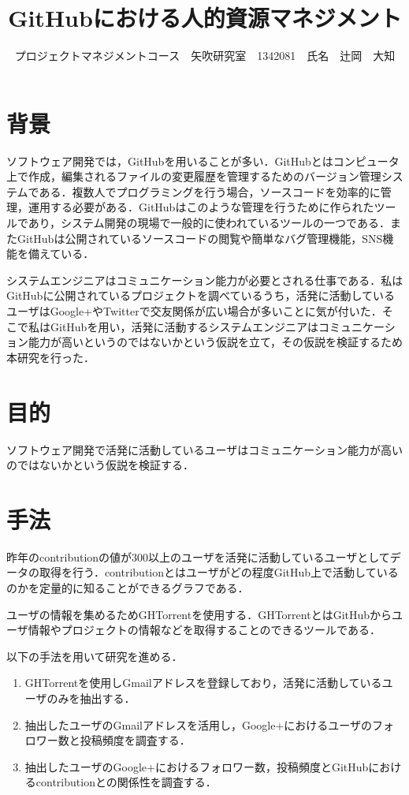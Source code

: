 \documentclass[uplatex,twocolumn,dvipdfmx]{jsarticle}
\title{\vspace{-5mm}\fontsize{14pt}{0pt}\selectfont GitHubにおける人的資源マネジメント}
\author{\normalsize プロジェクトマネジメントコース　矢吹研究室　1342081　氏名　辻岡　大知}
\date{}
\begin{document}
\fontsize{10.5pt}{\baselineskip}\selectfont
\maketitle





\section{背景}

ソフトウェア開発では，GitHubを用いることが多い．GitHubとはコンピュータ上で作成，編集されるファイルの変更履歴を管理するためのバージョン管理システムである．複数人でプログラミングを行う場合，ソースコードを効率的に管理，運用する必要がある．GitHubはこのような管理を行うために作られたツールであり，システム開発の現場で一般的に使われているツールの一つである\cite{a}．またGitHubは公開されているソースコードの閲覧や簡単なバグ管理機能，SNS機能を備えている．

システムエンジニアはコミュニケーション能力が必要とされる仕事である．私はGitHubに公開されているプロジェクトを調べているうち，活発に活動しているユーザはGoogle+やTwitterで交友関係が広い場合が多いことに気が付いた．そこで私はGitHubを用い，活発に活動するシステムエンジニアはコミュニケーション能力が高いというのではないかという仮説を立て，その仮説を検証するため本研究を行った．


\section{目的}

ソフトウェア開発で活発に活動しているユーザはコミュニケーション能力が高いのではないかという仮説を検証する．

\section{手法}

昨年のcontributionの値が300以上のユーザを活発に活動しているユーザとしてデータの取得を行う．contributionとはユーザがどの程度GitHub上で活動しているのかを定量的に知ることができるグラフである．

ユーザの情報を集めるためGHTorrentを使用する．GHTorrentとはGitHubからユーザ情報やプロジェクトの情報などを取得することのできるツールである．

以下の手法を用いて研究を進める．

\begin{enumerate}
 \item GHTorrent\cite{GHTorrent}を使用しGmailアドレスを登録しており，活発に活動しているユーザのみを抽出する．
 \item 抽出したユーザのGmailアドレスを活用し，Google+におけるユーザのフォロワー数と投稿頻度を調査する．
 \item 抽出したユーザのGoogle+におけるフォロワー数，投稿頻度とGitHubにおけるcontributionとの関係性を調査する．
\end{enumerate}
\end{document}
